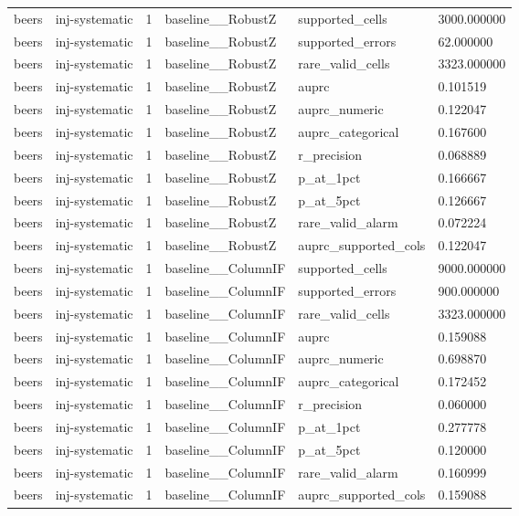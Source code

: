 \begin{tabular}{llllll}
beers & inj-systematic & 1 & baseline\_\_RobustZ & supported\_cells & 3000.000000 \\
beers & inj-systematic & 1 & baseline\_\_RobustZ & supported\_errors & 62.000000 \\
beers & inj-systematic & 1 & baseline\_\_RobustZ & rare\_valid\_cells & 3323.000000 \\
beers & inj-systematic & 1 & baseline\_\_RobustZ & auprc & 0.101519 \\
beers & inj-systematic & 1 & baseline\_\_RobustZ & auprc\_numeric & 0.122047 \\
beers & inj-systematic & 1 & baseline\_\_RobustZ & auprc\_categorical & 0.167600 \\
beers & inj-systematic & 1 & baseline\_\_RobustZ & r\_precision & 0.068889 \\
beers & inj-systematic & 1 & baseline\_\_RobustZ & p\_at\_1pct & 0.166667 \\
beers & inj-systematic & 1 & baseline\_\_RobustZ & p\_at\_5pct & 0.126667 \\
beers & inj-systematic & 1 & baseline\_\_RobustZ & rare\_valid\_alarm & 0.072224 \\
beers & inj-systematic & 1 & baseline\_\_RobustZ & auprc\_supported\_cols & 0.122047 \\
beers & inj-systematic & 1 & baseline\_\_ColumnIF & supported\_cells & 9000.000000 \\
beers & inj-systematic & 1 & baseline\_\_ColumnIF & supported\_errors & 900.000000 \\
beers & inj-systematic & 1 & baseline\_\_ColumnIF & rare\_valid\_cells & 3323.000000 \\
beers & inj-systematic & 1 & baseline\_\_ColumnIF & auprc & 0.159088 \\
beers & inj-systematic & 1 & baseline\_\_ColumnIF & auprc\_numeric & 0.698870 \\
beers & inj-systematic & 1 & baseline\_\_ColumnIF & auprc\_categorical & 0.172452 \\
beers & inj-systematic & 1 & baseline\_\_ColumnIF & r\_precision & 0.060000 \\
beers & inj-systematic & 1 & baseline\_\_ColumnIF & p\_at\_1pct & 0.277778 \\
beers & inj-systematic & 1 & baseline\_\_ColumnIF & p\_at\_5pct & 0.120000 \\
beers & inj-systematic & 1 & baseline\_\_ColumnIF & rare\_valid\_alarm & 0.160999 \\
beers & inj-systematic & 1 & baseline\_\_ColumnIF & auprc\_supported\_cols & 0.159088 \\

\end{tabular}
